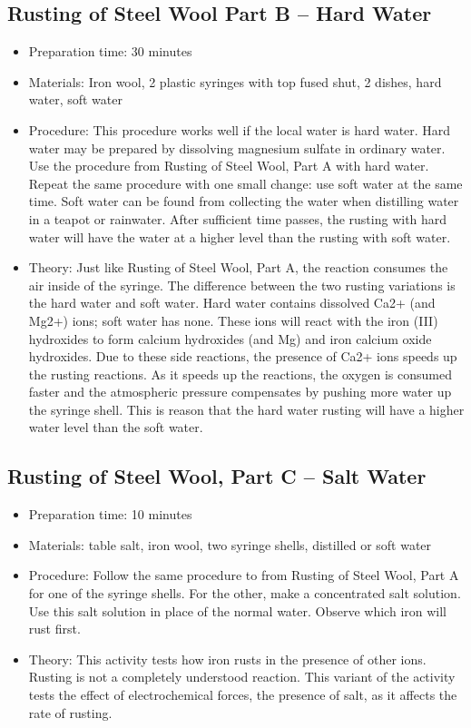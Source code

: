 \subsection{Rusting of Steel Wool Part B – Hard Water}
\begin{itemize}
\item{Preparation time: 30 minutes}
\item{Materials: Iron wool, 2 plastic syringes with top fused shut, 2 dishes, hard water, soft water}
\item{Procedure: This procedure works well if the local water is hard water. Hard water may be prepared by dissolving magnesium sulfate in ordinary water. Use the procedure from Rusting of Steel Wool, Part A with hard water. Repeat the same procedure with one small change: use soft water at the same time. Soft water can be found from collecting the water when distilling water in a teapot or rainwater. After sufficient time passes, the rusting with hard water will have the water at a higher level than the rusting with soft water.}
\item{Theory: Just like Rusting of Steel Wool, Part A, the reaction consumes the air inside of the syringe. The difference between the two rusting variations is the hard water and soft water. Hard water contains dissolved Ca2+ (and Mg2+) ions; soft water has none. These ions will react with the iron (III) hydroxides to form calcium hydroxides (and Mg) and iron calcium oxide hydroxides. Due to these side reactions, the presence of Ca2+ ions speeds up the rusting reactions. As it speeds up the reactions, the oxygen is consumed faster and the atmospheric pressure compensates by pushing more water up the syringe shell. This is reason that the hard water rusting will have a higher water level than the soft water.}
\end{itemize}

\subsection{Rusting of Steel Wool, Part C – Salt Water}
\begin{itemize}
\item{Preparation time: 10 minutes}
\item{Materials: table salt, iron wool, two syringe shells, distilled or soft water}
\item{Procedure: Follow the same procedure to from Rusting of Steel Wool, Part A for one of the syringe shells. For the other, make a concentrated salt solution. Use this salt solution in place of the normal water. Observe which iron will rust first.}
\item{Theory: This activity tests how iron rusts in the presence of other ions. Rusting is not a completely understood reaction. This variant of the activity tests the effect of electrochemical forces, the presence of salt, as it affects the rate of rusting.}
\end{itemize}

